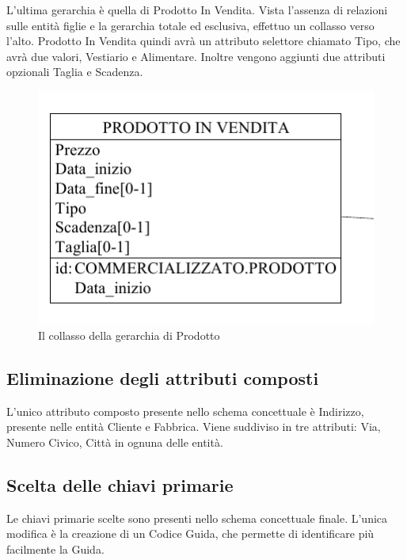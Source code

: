 \documentclass[a4paper,12pt]{report}
\begin{document}
L'ultima gerarchia è quella di Prodotto In Vendita. Vista l'assenza di relazioni sulle entità figlie e la gerarchia totale ed esclusiva, effettuo un collasso verso l'alto. 
Prodotto In Vendita quindi avrà un attributo selettore chiamato Tipo, che avrà due valori, Vestiario e Alimentare. Inoltre vengono aggiunti due attributi opzionali Taglia e Scadenza.
\begin{figure}[H]
	\centering{}
	\includegraphics[width=\textwidth]{img/SchemaLogico-Prodotto.pdf}
	\caption{Il collasso della gerarchia di Prodotto}
\end{figure}
\subsection{Eliminazione degli attributi composti}
L'unico attributo composto presente nello schema concettuale è Indirizzo, presente nelle entità Cliente e Fabbrica. Viene suddiviso in tre attributi: Via, Numero Civico, Città in ognuna delle entità.
\subsection{Scelta delle chiavi primarie}
Le chiavi primarie scelte sono presenti nello schema concettuale finale. 
L'unica modifica è la creazione di un Codice Guida, che permette di identificare più facilmente la Guida.
\end{document}
